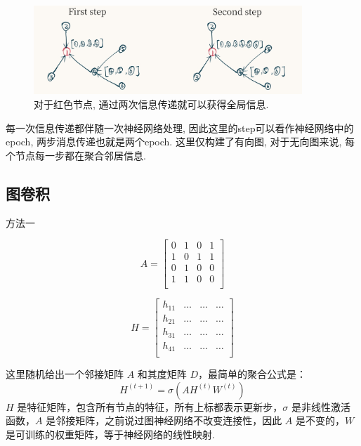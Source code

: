 \documentclass{beamer}
\begin{document}
\begin{frame}
    \begin{figure}
        \includegraphics[width=0.9\textwidth]{两步消息传递.png}
        \caption{对于红色节点, 通过两次信息传递就可以获得全局信息.}
    \end{figure}
    每一次信息传递都伴随一次神经网络处理, 因此这里的step可以看作神经网络中的epoch, 两步消息传递也就是两个epoch. 这里仅构建了有向图, 对于无向图来说, 每个节点每一步都在聚合邻居信息.
\end{frame}

\subsection{图卷积}

\begin{frame}{方法一}
    \small
    \vspace{-1cm}
    \begin{multicols}{2}
        \[
            A =
            \begin{bmatrix}
                0 & 1 & 0 & 1 \\
                1 & 0 & 1 & 1 \\
                0 & 1 & 0 & 0 \\
                1 & 1 & 0 & 0 \\
            \end{bmatrix}
        \]

        \[
            H =
            \begin{bmatrix}
                h_{11} & \ldots & \ldots & \ldots \\
                h_{21} & \ldots & \ldots & \ldots \\
                h_{31} & \ldots & \ldots & \ldots \\
                h_{41} & \ldots & \ldots & \ldots \\
            \end{bmatrix}
        \]
    \end{multicols}

    这里随机给出一个邻接矩阵 \(A\) 和其度矩阵 \(D\)，最简单的聚合公式是：
    \[ H^{(t+1)} = \sigma(AH^{(t)}W^{(t)}) \]
    \(H\) 是特征矩阵，包含所有节点的特征，所有上标都表示更新步，\(\sigma\) 是非线性激活函数，\(A\) 是邻接矩阵，之前说过图神经网络不改变连接性，因此 \(A\) 是不变的，\(W\) 是可训练的权重矩阵，等于神经网络的线性映射.
\end{frame}
\end{document}
